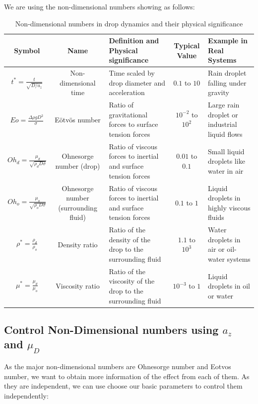 \documentclass[12pt]{article}
\begin{document}
We are using the non-dimensional numbers showing as follows:


\begin{table}[H]
\scriptsize
\centering
\caption{Non-dimensional numbers in drop dynamics and their physical significance}
\renewcommand{\arraystretch}{1.2} %
\begin{tabularx}{\textwidth}{|c|c|X|c|X|}
\hline
\textbf{Symbol} & \textbf{Name} & \textbf{Definition and Physical significance} & \textbf{Typical Value} & \textbf{Example in Real Systems} \\ \hline
$t^* = \frac{t}{\sqrt{D/a_z}}$ & Non-dimensional time & Time scaled by drop diameter and acceleration & $0.1$ to $10$ & Rain droplet falling under gravity \\ \hline
$Eo = \frac{\Delta \rho g D^2}{\sigma}$ & Eötvös number & Ratio of gravitational forces to surface tension forces & $10^{-2}$ to $10^2$ & Large rain droplet or industrial liquid flows \\ \hline
$Oh_d = \frac{\mu_d}{\sqrt{\rho_d D \sigma}}$ & Ohnesorge number (drop) & Ratio of viscous forces to inertial and surface tension forces & $0.01$ to $0.1$ & Small liquid droplets like water in air \\ \hline
$Oh_o = \frac{\mu_o}{\sqrt{\rho_o D \sigma}}$ & Ohnesorge number (surrounding fluid) & Ratio of viscous forces to inertial and surface tension forces & $0.1$ to $1$ & Liquid droplets in highly viscous fluids \\ \hline
$\rho^* = \frac{\rho_d}{\rho_o}$ & Density ratio & Ratio of the density of the drop to the surrounding fluid & $1.1$ to $10^3$ & Water droplets in air or oil-water systems \\ \hline
$\mu^* = \frac{\mu_d}{\mu_o}$ & Viscosity ratio & Ratio of the viscosity of the drop to the surrounding fluid & $10^{-3}$ to $1$ & Liquid droplets in oil or water \\ \hline
\end{tabularx}
\label{tab:NonDimensionalNumbersSignificance}
\end{table}


\subsection{Control Non-Dimensional numbers using $a_z$ and $\mu_D$}


As the major non-dimensional numbers are Ohnesorge number and Eotvos number, we want to obtain more information of the effect from each of them. As they are independent, we can use choose our basic parameters to control them independently:
\end{document}
